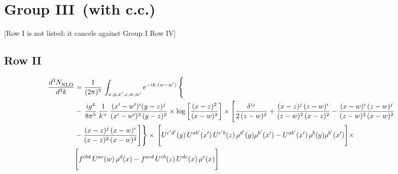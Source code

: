 \documentclass[9pt]{article}
\numberwithin{equation}{section}
\begin{document}
\section{Group III\, (with c.c.)} {\color{red}[Row I is not listed: it cancels against Group I Row IV]}\par\noindent
\subsection{Row II}
\begin{align}
     \frac{d^{3}N_{\rm NLO}^{\rm}}{d^{3}k}  & =   \frac{1}{(2\pi)^{3}}\, \int_{x,y,x',z,w,w^{\prime}} e^{-ik\cdot (w-w')}\, \Bigg\{\notag \\
& -\,\frac{ig^{4}}{8\pi^{5}}\,\frac{1}{k^{+}}\,\frac{(x'-w')^{i}(y-z)^{j}}{(x'-w')^{2}\,(y-z)^{2}}\times \log{\left[\frac{(x-z)^{2}}{(x-w)^{2}}\right]}\times \Bigg[\frac{\delta^{ij}}{2\,(z-w)^{2}}+\frac{(x-z)^{j}\,(z-w)^{i}}{(z-w)^{2}\,(x-z)^{2}} -\frac{(x-w)^{i}\,(z-w)^{j}}{(z-w)^{2}\,(x-w)^{2}}\notag \\ & -\frac{(x-z)^{j}\,(x-w)^{i}}{(x-z)^{2}\,(x-w)^{2}}\Bigg]\Bigg\}\times\,\Bigg[U^{c'd'}(y)\,U^{ab'}(x')\,U^{c'b}(z)\,\rho^{d'}(y)\rho^{b'}(x')-U^{ab'}(x')\,\rho^{b}(y)\rho^{b'}(x')\Bigg]\times\notag \\ & \Bigg[f^{cbd}\,U^{ac}(w)\,\rho^{d}(x)-f^{acd}\, U^{cb}(z)\,U^{de}(x)\,\rho^{e}(x)\Bigg]
\end{align}
\end{document}
